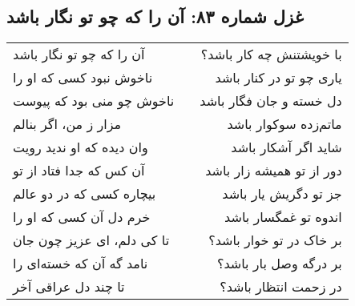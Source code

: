 \begin{center}
\section*{غزل شماره ۸۳: آن را که چو تو نگار باشد}
\label{sec:083}
\begin{longtable}{l p{0.5cm} r}
آن را که چو تو نگار باشد
&&
با خویشتنش چه کار باشد؟
\\
ناخوش نبود کسی که او را
&&
یاری چو تو در کنار باشد
\\
ناخوش چو منی بود که پیوست
&&
دل خسته و جان فگار باشد
\\
مزار ز من، اگر بنالم
&&
ماتم‌زده سوکوار باشد
\\
وان دیده که او ندید رویت
&&
شاید اگر آشکار باشد
\\
آن کس که جدا فتاد از تو
&&
دور از تو همیشه زار باشد
\\
بیچاره کسی که در دو عالم
&&
جز تو دگریش یار باشد
\\
خرم دل آن کسی که او را
&&
اندوه تو غمگسار باشد
\\
تا کی دلم، ای عزیز چون جان
&&
بر خاک در تو خوار باشد؟
\\
نامد گه آن که خسته‌ای را
&&
بر درگه وصل بار باشد؟
\\
تا چند دل عراقی آخر
&&
در زحمت انتظار باشد؟
\\
\end{longtable}
\end{center}
